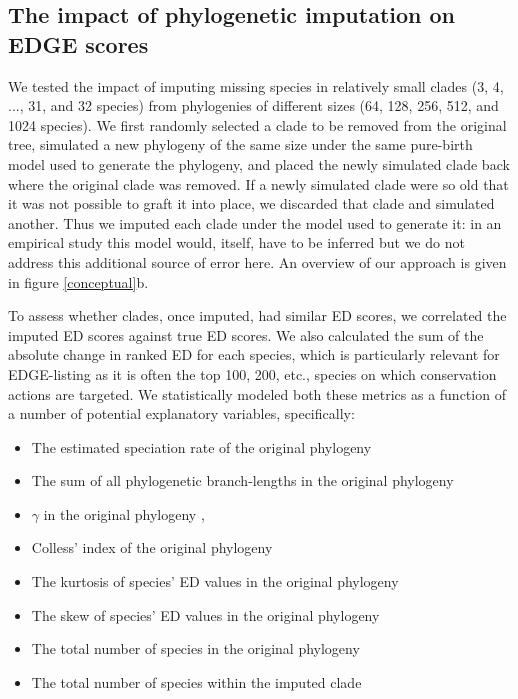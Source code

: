 \documentclass[12pt,english]{article}
\begin{document}
\subsection*{The impact of phylogenetic imputation on EDGE scores}
We tested the impact of imputing missing species in relatively small clades
(3, 4, ..., 31, and 32 species) from phylogenies of different sizes (64, 128,
256, 512, and 1024 species). We first randomly selected a clade to be removed
from the original tree, simulated a new phylogeny of the same size under the
same pure-birth model used to generate the phylogeny, and placed the newly
simulated clade back where the original clade was removed. If a newly simulated clade were so old that it was not possible to graft it into place, we discarded that clade and simulated another. Thus we imputed each
clade under the model used to generate it: in an empirical study this model
would, itself, have to be inferred but we do not address this additional source
of error here. An overview of our approach is given in figure \ref{conceptual}b.

To assess whether clades, once imputed, had similar ED scores, we
correlated the imputed ED scores against true ED scores. We also
calculated the sum of the absolute change in ranked ED for each
species, which is particularly relevant for EDGE-listing as it is
often the top 100, 200, etc., species on which conservation actions
are targeted. We statistically modeled both these metrics as a
function of a number of potential explanatory variables, specifically:

\begin{itemize}
\item The estimated speciation rate of the original phylogeny
  \autocite[$\lambda$, using the \texttt{yule} function in the R
  package \texttt{ape};][]{Paradis2004}
\item The sum of all phylogenetic branch-lengths in the original phylogeny
  \autocite[essentially Faith's PD;][]{Faith1992}
  \item $\gamma$ in the original phylogeny
  \autocite[using the \texttt{gammatest} function in the R package
  \texttt{phytools};][]{Pybus2000,Revell2012},
\item Colless' index of the original phylogeny \autocite[using the
  \texttt{as.treeshape} function in the R package
  \texttt{apTreeshape};][]{Colless1982,Bortolussi2009}
\item The kurtosis of species' ED values in the original phylogeny
  \autocite[using the \texttt{moments} function in the R package
  \texttt{kurtosis};][]{Komsta2015}
\item The skew of species' ED values in the original phylogeny
  \autocite[using the \texttt{skew} function in the R package
  \texttt{moments};][]{Komsta2015}
\item The total number of species in the original phylogeny
\item The total number of species within the imputed clade
\end{itemize}
\end{document}
